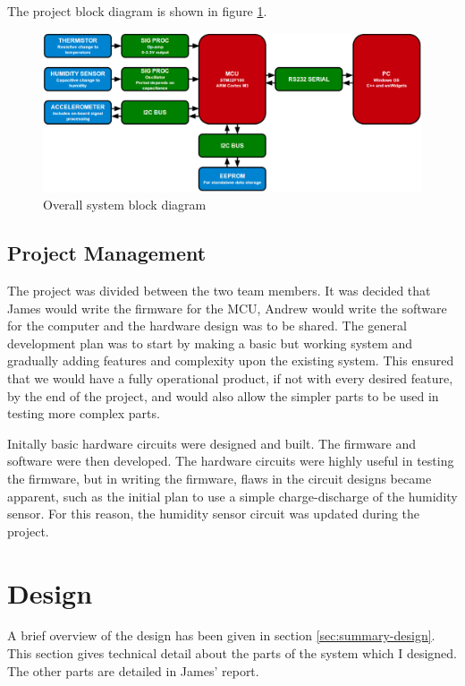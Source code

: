 \documentclass[a4paper,10pt]{article}  %
\begin{document}
The project block diagram is shown in figure \ref{fig:sysblkdgrm}.
\begin{figure}[htb]
  \begin{center}
    \includegraphics[width=1.0\textwidth]{System_diagram.png}
  \end{center}
  \caption{Overall system block diagram}
  \label{fig:sysblkdgrm}
\end{figure}

\subsection{Project Management}
\label{sec:project-management}

The project was divided between the two team members. It was decided
that James would write the firmware for the MCU, Andrew would write
the software for the computer and the hardware design was to be
shared. The general development plan was to start by making a basic
but working system and gradually adding features and complexity upon
the existing system. This ensured that we would have a fully
operational product, if not with every desired feature, by the end of the
project, and would also allow the simpler parts to be used in testing
more complex parts.

Initally basic hardware circuits were designed and built. The firmware
and software were then developed. The hardware circuits were highly
useful in testing the firmware, but in writing the firmware, flaws in
the circuit designs became apparent, such as the initial plan to use a
simple charge-discharge of the humidity sensor. For this reason, the
humidity sensor circuit was updated during the project.

\section{Design}
\label{sec:design}

A brief overview of the design has been given in section
\ref{sec:summary-design}. This section gives technical detail about
the parts of the system which I designed. The other parts are detailed
in James' report.
\end{document}
